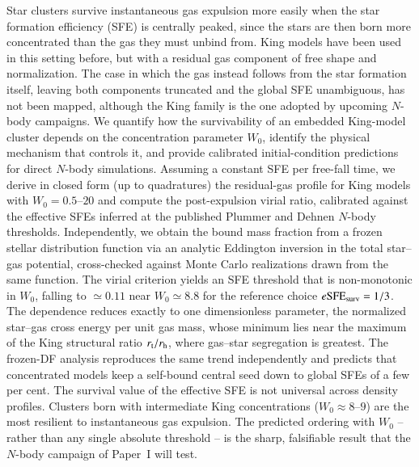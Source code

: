 \documentclass{aa}
\newcommand{\esfe}{e{\rm SFE}}
\newcommand{\rhalf}{r_{\rm h}}
\newcommand{\rtid}{r_{\rm t}}
\begin{document}
\abstract
{Star clusters survive instantaneous gas expulsion more easily when the
star formation efficiency (SFE) is centrally peaked, since the stars are
then born more concentrated than the gas they must unbind from. King
models have been used in this setting before, but with a residual gas
component of free shape and normalization. The case in which the gas
instead follows from the star formation itself, leaving both components
truncated and the global SFE unambiguous, has not been mapped, although
the King family is the one adopted by upcoming $N$-body campaigns.}
{We quantify how the survivability of an embedded King-model cluster
depends on the concentration parameter $W_0$, identify the physical
mechanism that controls it, and provide calibrated initial-condition
predictions for direct $N$-body simulations.}
{Assuming a constant SFE per free-fall time, we derive in closed form
(up to quadratures) the residual-gas profile for King models with
$W_0=0.5$--$20$ and compute the post-expulsion virial ratio, calibrated
against the effective SFEs inferred at the published Plummer and Dehnen
$N$-body thresholds. Independently, we obtain the bound mass fraction
from a frozen stellar distribution function via an analytic Eddington
inversion in the total star--gas potential, cross-checked against Monte
Carlo realizations drawn from the same function.}
{The virial criterion yields an SFE threshold that is non-monotonic in
$W_0$, falling to $\simeq0.11$ near $W_0\simeq8.8$ for the reference
choice $\esfe_{\rm surv}=1/3$. The dependence reduces exactly to one
dimensionless parameter, the normalized star--gas cross energy per unit
gas mass, whose minimum lies near the maximum of the King structural
ratio $\rtid/\rhalf$, where gas--star segregation is greatest. The
frozen-DF analysis reproduces the same trend independently and predicts
that concentrated models keep a self-bound central seed down to global
SFEs of a few per cent. The survival value of the effective SFE is not
universal across density profiles.}
{Clusters born with intermediate King concentrations
($W_0\approx8$--$9$) are the most resilient to instantaneous gas
expulsion. The predicted ordering with $W_0$ -- rather than any single
absolute threshold -- is the sharp, falsifiable result that the
$N$-body campaign of Paper~I will test.}

\maketitle
\end{document}

